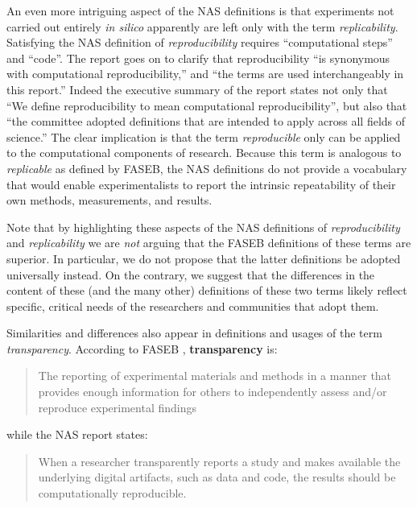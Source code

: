 An even more intriguing aspect of the NAS definitions \cite{committeeonreproducibilityandreplicabilityinscience2019reproducibility}
	is that experiments not carried out
	entirely \emph{in silico} apparently are left only with the term \emph{replicability}.
Satisfying the NAS definition of \emph{reproducibility} requires
	``computational steps'' and ``code''.  The report goes on to clarify
	that reproducibility ``is synonymous with computational reproducibility,''  and ``the terms are used interchangeably in this report.''
Indeed the executive summary of the report states not only that ``We define reproducibility to mean computational reproducibility'',
	but also that ``the committee adopted definitions that are intended to apply across all fields of science.''
The clear implication is that the term \emph{reproducible} only can be applied to the computational components of research.
Because this term is analogous to \emph{replicable} as defined by FASEB, the NAS definitions do not provide a vocabulary
	that would enable experimentalists to report the intrinsic repeatability of their own methods, measurements, and results.

Note that by highlighting these aspects of the NAS definitions
	of \emph{reproducibility} and \emph{replicability} we are \emph{not} arguing
 	that the FASEB definitions of these terms are superior.
In particular, we do not propose that the latter definitions be adopted universally instead.
On the contrary, we suggest that the differences in the content of these (and the many other) definitions
of these two terms likely reflect specific, critical needs of the researchers and communities that adopt them.

Similarities and differences also appear in definitions and usages of the term \emph{transparency}.
According to FASEB \cite{FASEB2016enhancing}, \textbf{transparency} is:
\begin{quote}
	The reporting of experimental materials and methods in a manner that provides enough information
	for others to independently assess and/or reproduce experimental findings
      \end{quote}
while the NAS report \cite{committeeonreproducibilityandreplicabilityinscience2019reproducibility} states:
 \begin{quote}
	When a researcher transparently reports a study and makes available the underlying digital artifacts, such as data and code,
	the results should be computationally reproducible.
      \end{quote}

